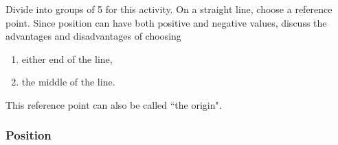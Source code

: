         \label{m38787*id62809}Divide into groups of 5 for this activity.
On a straight line, choose a reference point. Since position can have both positive and negative values, discuss the advantages and disadvantages of choosing\par 
        \label{m38787*id62816}\begin{enumerate}[noitemsep, label=\textbf{\arabic*}. ] 
            \label{m38787*uid9}\item either end of the line,
\label{m38787*uid10}\item the middle of the line.
\end{enumerate}
        
        \label{m38787*id62843}This reference point can also be called ``the origin". \par 

\label{m38787*secfhsst!!!underscore!!!id138}
            \subsubsection{  Position }
            \nopagebreak
            
